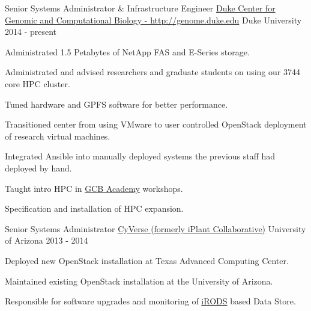 

\begin{cventries}

  \cventry
    {Senior Systems Administrator \& Infrastructure Engineer} %
    {\href{http://genome.duke.edu}{Duke Center for Genomic and Computational Biology - http://genome.duke.edu}} %
    {Duke University} %
    {2014 - present} %
    {
      \begin{cvitems} %
        \item {Administrated 1.5 Petabytes of NetApp FAS and E-Series storage.}
        \item {Administrated and advised researchers and graduate students on using our 3744 core HPC cluster.}
        \item {Tuned hardware and GPFS software for better performance.}
        \item {Transitioned center from using VMware to user controlled OpenStack deployment of research virtual machines.}
        \item {Integrated Ansible into manually deployed systems the previous staff had deployed by hand.}
        \item {Taught intro HPC in \href{http://genome.duke.edu/gcb-academy}{GCB Academy} workshops.}
        \item {Specification and installation of HPC expansion.}
      \end{cvitems}
    }

  \cventry
    {Senior Systems Administrator} %
    {\href{http://cyverse.org/}{CyVerse (formerly iPlant Collaborative)}} %
    {University of Arizona} %
    {2013 - 2014} %
    {
      \begin{cvitems} %
        \item {Deployed new OpenStack installation at Texas Advanced Computing Center.}
        \item {Maintained existing OpenStack installation at the University of Arizona.}
        \item {Responsible for software upgrades and monitoring of \href{http://irods.org/}{iRODS} based Data Store.}
      \end{cvitems}
    }


\end{cventries}
